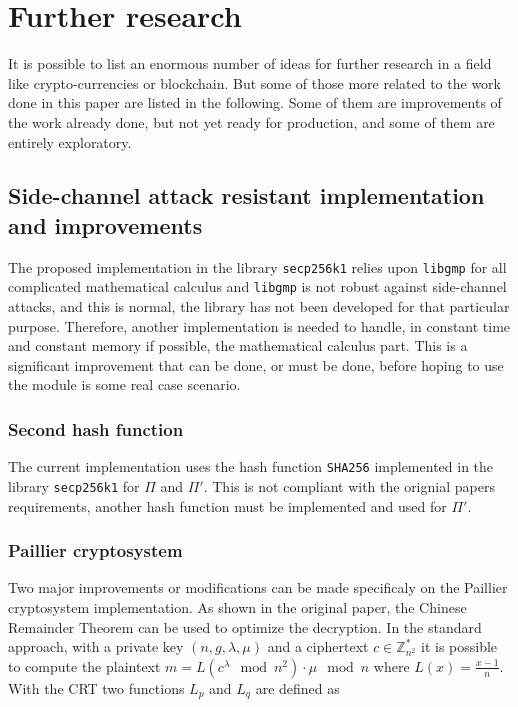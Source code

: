 \chapter{Further research}
\label{chap:furtherResearch}

It is possible to list an enormous number of ideas for further research in a field
like crypto-currencies or blockchain. But some of those more related to the work
done in this paper are listed in the following. Some of them are improvements of
the work already done, but not yet ready for production, and some of them are
entirely exploratory.

\section{Side-channel attack resistant implementation and improvements}

The proposed implementation in the library \texttt{secp256k1} relies upon
\texttt{libgmp} for all complicated mathematical calculus and \texttt{libgmp} is
not robust against side-channel attacks, and this is normal, the library has not
been developed for that particular purpose. Therefore, another implementation
is needed to handle, in constant time and constant memory if
possible, the mathematical calculus part. This is a significant improvement that
can be done, or must be done, before hoping to use the module is some real case
scenario.

\subsection{Second hash function}

The current implementation uses the hash function \texttt{SHA256} implemented
in the library \texttt{secp256k1} for $\Pi$ and $\Pi'$. This is not compliant
with the orignial papers requirements, another hash function must be implemented
and used for $\Pi'$.

\subsection{Paillier cryptosystem}

Two major improvements or modifications can be made specificaly on the
Paillier cryptosystem implementation. As shown in the original paper, the
Chinese Remainder Theorem can be used to optimize the decryption. In the
standard approach, with a private key $(n, g, \lambda, \mu)$ and a ciphertext $c
\in \mathbb{Z}_{n^2}^*$ it is possible to compute the plaintext $m =
L(c^{\lambda} \mod n^2) \cdot \mu \mod n$ where $L(x) = \frac{x-1}{n}$. With the
CRT two functions $L_p$ and $L_q$ are defined as

